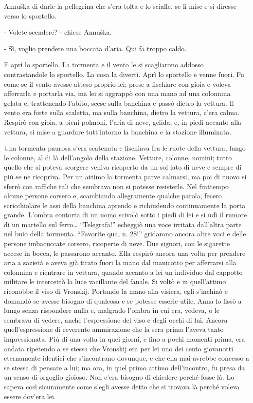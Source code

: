 Annuška di darle la pellegrina che s'era tolta e lo scialle, se li mise e si diresse verso lo sportello. 

- Volete scendere? - chiese Annuška. 

- Sì, voglio prendere una boccata d'aria. Qui fa troppo caldo. 

E aprì lo sportello. La tormenta e il vento le si scagliarono addosso contrastandole lo sportello. La cosa la divertì. Aprì lo sportello e venne fuori. Fu come se il vento avesse atteso proprio lei; prese a fischiare con gioia e voleva afferrarla e portarla via, ma lei si aggrappò con una mano ad una colonnina gelata e, trattenendo l'abito, scese sulla banchina e passò dietro la vettura. Il vento era forte sulla scaletta, ma sulla banchina, dietro la vettura, c'era calma. Respirò con gioia, a pieni polmoni, l'aria di neve, gelida, e, in piedi accanto alla vettura, si mise a guardare tutt'intorno la banchina e la stazione illuminata. 
\enlargethispage*{1\baselineskip}
\label{xxx} 

Una tormenta paurosa s'era scatenata e fischiava fra le ruote della vettura, lungo le colonne, al di là dell'angolo della stazione. Vetture, colonne, uomini; tutto quello che si poteva scorgere veniva ricoperto da un sol lato di neve e sempre di più se ne ricopriva. Per un attimo la tormenta parve calmarsi, ma poi di nuovo si sferrò con raffiche tali che sembrava non si potesse resisterle. Nel frattempo alcune persone corsero e, scambiando allegramente qualche parola, fecero scricchiolare le assi della banchina aprendo e richiudendo continuamente la porta grande. L'ombra contorta di un uomo scivolò sotto i piedi di lei e si udì il rumore di un martello sul ferro\ldots{} ``Telegrafa!'' echeggiò una voce irritata dall'altra parte nel buio della tormenta. ``Favorite qua, n. 28!'' gridarono ancora altre voci e delle persone imbacuccate corsero, ricoperte di neve. Due signori, con le sigarette accese in bocca, le passarono accanto. Ella respirò ancora una volta per prendere aria a sazietà e aveva già tirato fuori la mano dal manicotto per afferrarsi alla colonnina e rientrare in vettura, quando accanto a lei un individuo dal cappotto militare le intercettò la luce vacillante del fanale. Si voltò e in quell'attimo riconobbe il viso di Vronskij. Portando la mano alla visiera, egli s'inchinò e domandò se avesse bisogno di qualcosa e se potesse esserle utile. Anna lo fissò a lungo senza rispondere nulla e, malgrado l'ombra in cui era, vedeva, o le sembrava di vedere, anche l'espressione del viso e degli occhi di lui. Ancora quell'espressione di reverente ammirazione che la sera prima l'aveva tanto impressionata. Più di una volta in quei giorni, e fino a pochi momenti prima, era andata ripetendo a se stessa che Vronskij era per lei uno dei cento giovanotti eternamente identici che s'incontrano dovunque, e che ella mai avrebbe concesso a se stessa di pensare a lui; ma ora, in quel primo attimo dell'incontro, fu presa da un senso di orgoglio gioioso. Non c'era bisogno di chiedere perché fosse là. Lo sapeva così sicuramente come s'egli avesse detto che si trovava là perché voleva essere dov'era lei. 

